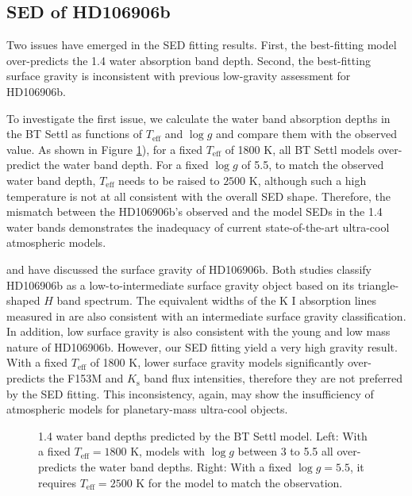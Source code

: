 \documentclass[modern]{aastex62}
\begin{document}
\subsection{SED of  HD106906b}
Two issues have emerged in the SED fitting results. First, the best-fitting model over-predicts the 1.4 \micron{} water absorption band depth. Second, the best-fitting surface gravity is inconsistent with previous low-gravity assessment for HD106906b.

To investigate the first issue, we calculate the water band absorption depths in the BT Settl as functions of $T_{\mathrm{eff}}$ and $\log g$ and compare them with the observed value. As shown in Figure \ref{fig:waterdepth}), for a fixed $T_{\mathrm{eff}}$ of 1800 K, all BT Settl models over-predict the water band depth. For a fixed $\log g$ of 5.5, to match the observed water band depth, $T_{\mathrm{eff}}$ needs to be raised to $2500$ K, although such a high temperature is not at all consistent with the overall SED shape. Therefore, the mismatch between the HD106906b's observed and the model SEDs in the 1.4 \micron{} water bands demonstrates the inadequacy of current state-of-the-art ultra-cool atmospheric models.

\citet{Bailey2013} and \citet{Daemgen2017} have discussed the surface gravity of HD106906b. Both studies classify HD106906b as a low-to-intermediate surface gravity object based on its triangle-shaped $H$ band spectrum. The equivalent widths of the K I absorption lines measured in \citet{Daemgen2017} are also consistent with an intermediate surface gravity classification. In addition, low surface gravity is also consistent with the young and low mass nature of HD106906b. However, our SED fitting yield a very high gravity result. With a fixed $T_{\mathrm{eff}}$ of 1800 K, lower surface gravity models significantly over-predicts the F153M and $K_{\mathrm{s}}$ band flux intensities, therefore they are not preferred by the SED fitting. This inconsistency, again, may show the insufficiency of atmospheric models for planetary-mass ultra-cool objects.

\begin{figure}
  \centering
  \caption{1.4 \micron{} water band depths predicted by the BT Settl model. Left: With a fixed $T_{\mathrm{eff}}=1800$ K, models with $\log g$ between 3 to 5.5 all over-predicts the water band depths. Right: With a fixed $\log g=5.5$, it requires $T_{\mathrm{eff}}=2500$ K for the model to match the observation.}
  \label{fig:waterdepth}
\end{figure}



\end{document}
